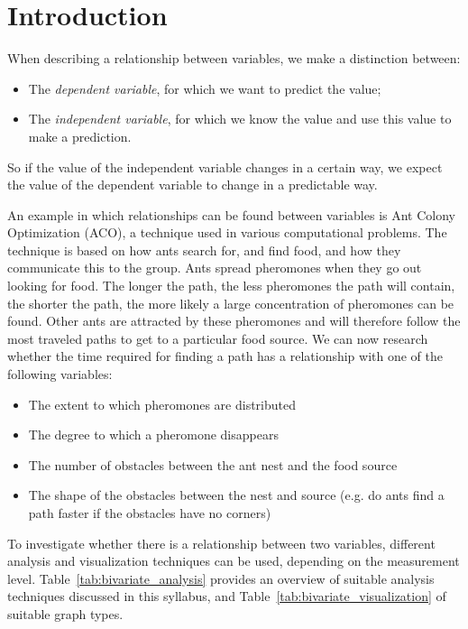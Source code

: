 \section{Introduction}
\label{sec:bivariate-analysis-introduction}

When describing a relationship between variables, we make a distinction between:

\begin{itemize}
    \item The \emph{dependent variable}, for which we want to predict the value;
    \item The \emph{independent variable}, for which we know the value and use this value to make a prediction.
\end{itemize}

So if the value of the independent variable changes in a certain way, we expect the value of the dependent variable to change in a predictable way.

\begin{example}
    An example in which relationships can be found between variables is Ant Colony Optimization (ACO), a technique used in various computational problems. The technique is based on how ants search for, and find food, and how they communicate this to the group. Ants spread pheromones when they go out looking for food. The longer the path, the less pheromones the path will contain, the shorter the path, the more likely a large concentration of pheromones can be found. Other ants are attracted by these pheromones and will therefore follow the most traveled paths to get to a particular food source. We can now research whether the time required for finding a path has a relationship with one of the following variables:
    
    \begin{itemize}
        \item The extent to which pheromones are distributed
        \item The degree to which a pheromone disappears
        \item The number of obstacles between the ant nest and the food source
        \item The shape of the obstacles between the nest and source (e.g. do ants find a path faster if the obstacles have no corners)
    \end{itemize}
\end{example}

To investigate whether there is a relationship between two variables, different analysis and visualization techniques can be used, depending on the measurement level. Table~\ref{tab:bivariate_analysis} provides an overview of suitable analysis techniques discussed in this syllabus, and Table~\ref{tab:bivariate_visualization} of suitable graph types.

